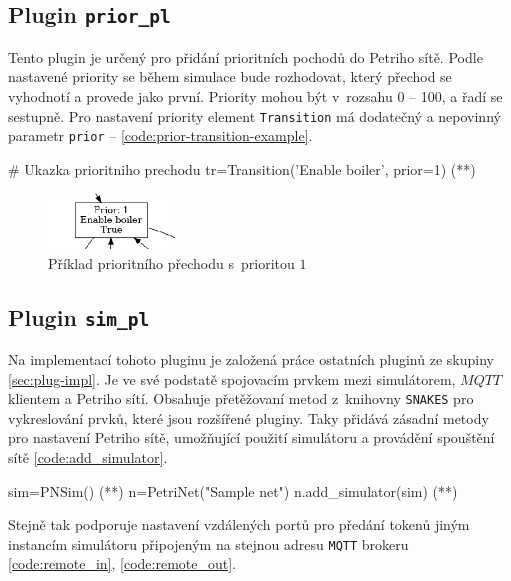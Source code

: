 \subsection{Plugin \texttt{prior\_pl}}
\label{subsec:prior_pl}
Tento plugin je určený pro přidání prioritních pochodů do Petriho sítě. Podle nastavené priority se během simulace bude rozhodovat, který přechod se vyhodnotí a provede jako první. Priority mohou být v~rozsahu 0 -- 100, a řadí se sestupně. Pro nastavení priority element \texttt{Transition} má dodatečný a nepovinný parametr \texttt{prior} -- \ref{code:prior-transition-example}.
\begin{python}
  # Ukazka prioritniho prechodu
  tr=Transition('Enable boiler', prior=1) (*\label{code:prior-transition-example}*)
\end{python}

\begin{figure}[hbt]
  \centering
  \includegraphics[width=0.3\textwidth]{obrazky-figures/prior-transition.png}
  \caption{Příklad prioritního přechodu s~prioritou $1$}
  \label{prior-transition}
\end{figure}

\subsection{Plugin \texttt{sim\_pl}}
\label{subsec:sim_pl}

Na implementací tohoto pluginu je založená práce ostatních pluginů ze skupiny \ref{sec:plug-impl}. Je ve své podstatě spojovacím prvkem mezi simulátorem, $MQTT$ klientem a Petriho sítí. Obsahuje přetěžovaní metod z~knihovny \texttt{SNAKES} pro vykreslování prvků, které jsou rozšířené pluginy. Taky přidává zásadní metody pro nastavení Petriho sítě, umožňující použití simulátoru a provádění spouštění sítě \ref{code:add_simulator}.
\begin{python}
  sim=PNSim() (*\label{code:sim-add}*)
  n=PetriNet("Sample net")
  n.add_simulator(sim) (*\label{code:add_simulator}*)
\end{python}

Stejně tak podporuje nastavení vzdálených portů pro předání tokenů jiným instancím simulátoru připojeným na stejnou adresu \texttt{MQTT} brokeru \ref{code:remote_in}, \ref{code:remote_out}.

